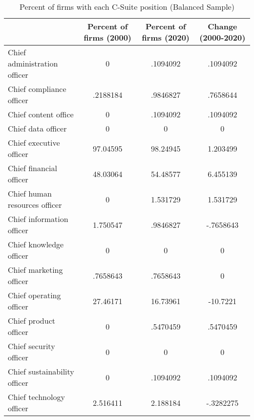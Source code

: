 \begin{table}[htbp]\centering
\caption{Percent of firms with each C-Suite position (Balanced Sample)\label{tab98}}
\begin{tabular}{l*{3}{c}}
\toprule
                    &Percent of firms (2000)&Percent of firms (2020)&Change (2000-2020)\\
\midrule
Chief administration officer&           0&    .1094092&    .1094092\\
Chief compliance officer&    .2188184&    .9846827&    .7658644\\
Chief content office&           0&    .1094092&    .1094092\\
Chief data officer  &           0&           0&           0\\
Chief executive officer&    97.04595&    98.24945&    1.203499\\
Chief financial officer&    48.03064&    54.48577&    6.455139\\
Chief human resources officer&           0&    1.531729&    1.531729\\
Chief information officer&    1.750547&    .9846827&   -.7658643\\
Chief knowledge officer&           0&           0&           0\\
Chief marketing officer&    .7658643&    .7658643&           0\\
Chief operating officer&    27.46171&    16.73961&    -10.7221\\
Chief product officer&           0&    .5470459&    .5470459\\
Chief security officer&           0&           0&           0\\
Chief sustainability officer&           0&    .1094092&    .1094092\\
Chief technology officer&    2.516411&    2.188184&   -.3282275\\
\bottomrule
\end{tabular}
\end{table}
